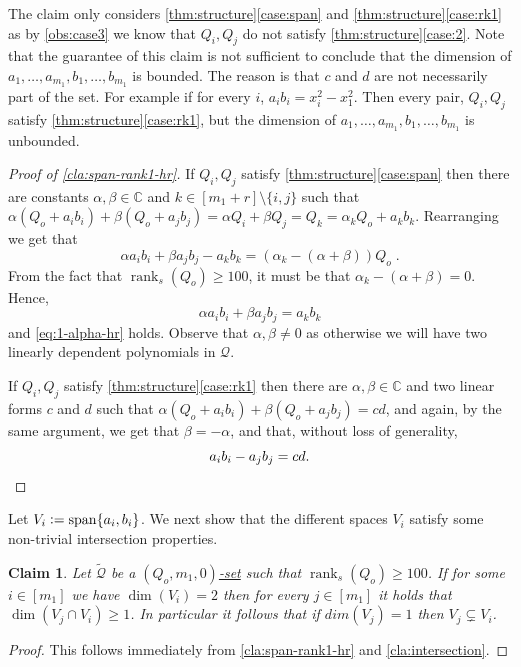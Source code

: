 \documentclass[10pt,a4paper]{article}
\newtheorem{claim}[theorem]{Claim}
\def\rank{\operatorname{rank}}
\newcommand{\eqdef}{\vcentcolon=}
\renewcommand{\C}{\mathbb{C}}
\newcommand{\cQ}{{\mathcal{Q}}}
\newcommand{\MVar}[2]{{#1}_1,\ldots, {#1}_{#2}}
\newcommand{\spn}[1]{\operatorname{span}\{{#1}\}}
\newcommand{\rkq}{100}
\begin{document}
The claim only considers \autoref{thm:structure}\ref{case:span} and \autoref{thm:structure}\ref{case:rk1} as by \autoref{obs:case3} we know that $Q_i,Q_j$ do not satisfy \autoref{thm:structure}\ref{case:2}.
 Note that the guarantee of this claim is not sufficient to conclude that the dimension of $\MVar{a}{m_1}, \MVar{b}{m_1}$ is bounded. The reason is that $ c$ and $d $ are not necessarily part of the set. For example if for every $i$, $a_ib_i = x_i^2 - x_1^2$. Then every pair, $Q_i, Q_j$ satisfy \autoref{thm:structure}\ref{case:rk1}, but the dimension of $\MVar{a}{m_1}, \MVar{b}{m_1}$ is unbounded.

\begin{proof}[Proof of \autoref{cla:span-rank1-hr}]
If $Q_i,Q_j$ satisfy \autoref{thm:structure}\ref{case:span} then there are constants  $\alpha, \beta \in \C$ and $k \in [m_1+r]\setminus \{i,j\}$ such that $\alpha (Q_o+a_ib_i) + \beta ( Q_o+a_jb_j) = \alpha Q_i+\beta Q_j = Q_k = \alpha_k Q_o+a_kb_k$. Rearranging we get that \[\alpha a_ib_i + \beta a_jb_j -a_kb_k = (\alpha_k-(\alpha+\beta))Q_o\;.\] From the fact that $\rank_s(Q_o) \geq \rkq$, it must be that $\alpha_k-(\alpha+\beta) = 0$. Hence,
\begin{equation} \label{eq:span-ak-hr}
 \alpha a_ib_i + \beta a_jb_j = a_kb_k
\end{equation}
and \eqref{eq:1-alpha-hr} holds. Observe that $\alpha, \beta \neq 0$ as otherwise we will have two linearly dependent polynomials in $\cQ$.

If $Q_i,Q_j$ satisfy \autoref{thm:structure}\ref{case:rk1} then there are $\alpha, \beta \in \C$ and two linear forms $c$ and $d$ such that $ \alpha (Q_o+a_ib_i) + \beta ( Q_o+a_jb_j) = cd$, and again, by the same argument, we get that  $\beta = -\alpha$, and that, without loss of generality,
\begin{equation*}
  a_ib_i -a_jb_j = cd. \qedhere
\end{equation*}
\end{proof}

Let $V_i \eqdef \spn{a_i,b_i}$. We next show that the different spaces $V_i$ satisfy some non-trivial intersection properties.

\begin{claim}\label{cla:V_i intersection-hr}
Let $\tilde{\cQ}$ be a \hyperref[def:Q-dom]{$(Q_o,m_1,0)$-set} such that $\rank_s(Q_o)\geq \rkq$. If for some $i\in [m_1]$ we have $\dim(V_i)=2$ then for every $j \in [m_1]$ it holds that  $\dim(V_j\cap V_i) \geq 1$. In particular it follows that if $dim(V_j)=1$ then $V_j\varsubsetneq V_i$.
\end{claim}
\begin{proof}

This follows immediately from \autoref{cla:span-rank1-hr} and \autoref{cla:intersection}. 

\end{proof}
\end{document}
